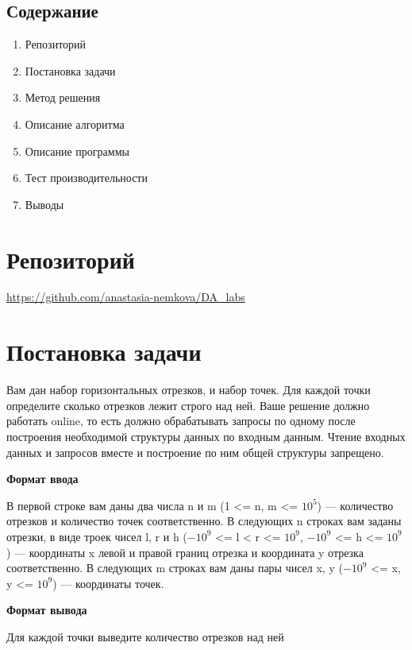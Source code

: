 \documentclass[12pt]{article}
\begin{document}
\begin{center}
\section*{Содержание}   
\end{center}
\vspace{5ex}
\begin{enumerate}
  \item Репозиторий
  \item Постановка задачи
  \item Метод решения
  \item Описание алгоритма
  \item Описание программы
  \item Тест производительности
  \item Выводы
\end{enumerate}
\newpage


\section*{Репозиторий}   
\vspace{2ex}
\url{https://github.com/anastasia-nemkova/DA_labs}

\section*{Постановка задачи}

Вам дан набор горизонтальных отрезков, и набор точек. Для каждой точки определите сколько отрезков лежит строго над ней.  Ваше решение должно работать online, то есть должно обрабатывать запросы по одному после построения необходимой структуры данных по входным данным. Чтение входных данных и запросов вместе и построение по ним общей структуры запрещено. 

\textbf{Формат ввода}

В первой строке вам даны два числа n и m (1 <= n, m <= $10^{5}$) — количество отрезков и количество точек соответственно. В следующих n строках вам заданы отрезки, в виде троек чисел l, r и h ($-10^{9}$ <= l < r <= $10^{9}$, $-10^{9}$ <= h <= $10^{9}$) — координаты x левой и правой границ отрезка и координата y отрезка соответственно. В следующих m строках вам даны пары чисел x, y ($-10^{9}$ <= x, y <= $10^{9}$) — координаты точек. 

\textbf{Формат вывода}

Для каждой точки выведите количество отрезков над ней
\end{document}
